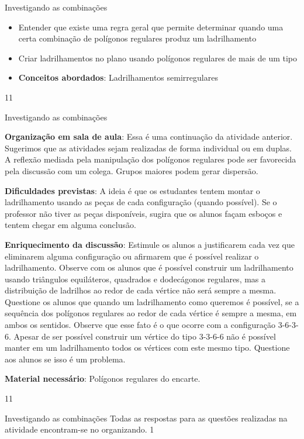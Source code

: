 \clearpage
\def\currentcolor{session1}

\begin{objectives}{Investigando as combinações}
{
	\begin{itemize}
	\item Entender que existe uma regra geral que permite determinar quando uma certa combinação de polígonos regulares produz um ladrilhamento
	\item Criar ladrilhamentos no plano usando polígonos regulares de mais de um tipo
	\item \textbf{Conceitos abordados}: Ladrilhamentos semirregulares
	\end{itemize}
}{1}{1}
\end{objectives}
\begin{sugestions}{Investigando as combinações}
{
	\textbf{Organização em sala de aula}: Essa é uma continuação da atividade anterior. Sugerimos que as atividades sejam realizadas de forma individual ou em duplas. A reflexão mediada pela manipulação dos polígonos regulares  pode ser favorecida pela discussão com um colega. Grupos maiores podem gerar dispersão.

	\textbf{Dificuldades previstas}: A ideia é que os estudantes  tentem  montar o ladrilhamento usando as peças de cada configuração (quando possível). Se o professor não tiver as peças disponíveis, sugira que os alunos façam esboços e tentem chegar em alguma conclusão.
 
	\textbf{Enriquecimento da discussão}: Estimule os alunos a justificarem cada vez que eliminarem alguma configuração ou afirmarem que é possível realizar o ladrilhamento. Observe com os alunos que é possível construir um ladrilhamento usando triângulos equiláteros, quadrados e dodecágonos regulares, mas a distribuição de ladrilhos ao redor de cada vértice não será sempre a mesma. Questione os  alunos que quando um ladrilhamento como queremos é possível,  se a sequência dos polígonos regulares  ao redor de cada vértice é sempre a mesma, em ambos os sentidos. Observe que esse fato é o  que ocorre com a configuração 3-6-3-6.  Apesar de ser possível construir um vértice do tipo 3-3-6-6 não é possível manter em um ladrilhamento todos os vértices com este mesmo tipo. Questione aos alunos se isso é um problema.

	\textbf{Material necessário}: Polígonos regulares do encarte.
}{1}{1}
\end{sugestions}
\begin{answer}{Investigando as combinações}
{
	Todas as respostas para as questões realizadas na atividade encontram-se no organizando.
}{1}
\end{answer}

